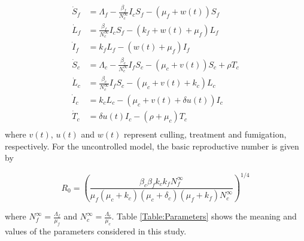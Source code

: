 \documentclass[preprint,12pt]{elsarticle}
\begin{document}
\begin{equation}\label{Eq:SIvectorhostmodelcontrol}
\begin{aligned}
    \dot{S}_f&= 
        \Lambda_f-\frac{\beta_f}{N_c^{\infty}}I_c S_f-(\mu_f+w(t))S_f
    \\
    \dot{L}_f&= 
        \frac{\beta_f}{N_c^{\infty}} I_c S_f-
        \left(
            k_f + w(t) + \mu_f
        \right) L_f
    \\
    \dot{I}_f&= 
        k_f L_f-(w(t)+\mu_f)I_f
    \\
    \dot{S}_c&= 
        \Lambda_c-\frac{\beta_c}{N_c^{\infty}}I_f S_c-
        \left(
            \mu_c + v(t)
        \right)
        S_c + \rho T_c
    \\
    \dot{L}_c&= 
        \frac{\beta_c}{N_c^{\infty}} I_f S_c - 
        \left(
            \mu_c + v(t) + 
            k_c
        \right)L_c
    \\
    \dot{I}_c&= 
        k_c L_c - 
        (\mu_c + v(t) + \delta u(t))I_c
    \\
    \dot{T}_c&= 
        \delta u(t) I_c - 
        \left(
            \rho  + \mu_c
        \right) T_c
    \\
\end{aligned}
\end{equation}
where $v(t)$, $u(t)$ and $w(t)$ represent culling, treatment and fumigation, 
respectively. For the uncontrolled model, the basic reproductive number is 
given by

  \begin{equation}\label{eq:R0}
     R_0=\left(\frac{\beta_c\beta_f k_c k_fN_f^{\infty}}{\mu_f(\mu_c+k_c)(\mu_c+\delta_c)(\mu_f+k_f)N_c^{\infty}} \right)^{1/4}
 \end{equation}

where 
$
    \displaystyle
    N_f^{\infty}=\frac{\Lambda_f}{\mu_f}
$ 
and 
$
    \displaystyle
    N_c^{\infty} = \frac{\Lambda_c}{\mu_c}
$. Table \ref{Table:Parameters} shows 
 the meaning and values of the parameters considered in this study.
 
\end{document}
